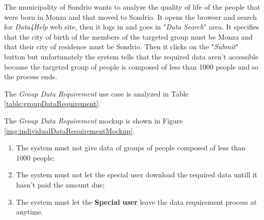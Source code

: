 The municipality of Sondrio wants to analyze the quality of life of the people that were born in Monza and that moved to Sondrio.  It opens the browser and search for \textit{Data4Help} web site, then it logs in and goes in "\textit{Data Search}" area. It specifies that the city of birth of the members of the targeted group must be Monza and that their city of residence must be Sondrio. Then it clicks on the "\textit{Submit}" button but unfortunately the system tells that the required data aren't accessible because the targeted group of people is composed of less than 1000 people and so the process ends.

The \textit{Group Data Requirement} use case is analyzed in Table \ref{table:groupDataRequirement}.

The \textit{Group Data Requirement} mockup is shown in Figure \ref{img:individualDataRequirementMockup}.

\begin{enumerate}
  \item The system must not give data of groups of people composed of less than 1000 people;
  \item The system must not let the special user download the required data untill it hasn't paid the amount due;
  \item The system must let the \textbf{Special user} leave the data requirement process at anytime.
\end{enumerate}

